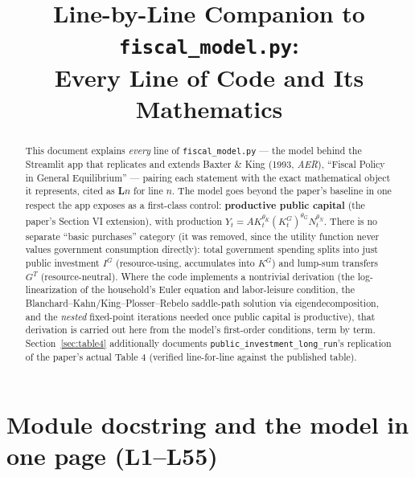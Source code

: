 \documentclass[11pt]{article}
\title{Line-by-Line Companion to \texttt{fiscal\_model.py}:\\
Every Line of Code and Its Mathematics}
\author{}
\date{}
\begin{document}
\maketitle

\begin{abstract}
\noindent This document explains \emph{every} line of \texttt{fiscal\_model.py}
--- the model behind the Streamlit app that replicates and extends Baxter \&
King (1993, \textit{AER}), ``Fiscal Policy in General Equilibrium'' ---
pairing each statement with the exact mathematical object it represents,
cited as \textbf{L}$n$ for line $n$. The model goes beyond the paper's
baseline in one respect the app exposes as a first-class control:
\textbf{productive public capital} (the paper's Section VI extension), with
production $Y_t=AK_t^{\theta_K}(K^G_t)^{\theta_G}N_t^{\theta_N}$. There is no
separate ``basic purchases'' category (it was removed, since the utility
function never values government consumption directly): total government
spending splits into just public investment $I^G$ (resource-using,
accumulates into $K^G$) and lump-sum transfers $G^T$ (resource-neutral).
Where the code implements a nontrivial derivation (the log-linearization of
the household's Euler equation and labor-leisure condition, the
Blanchard--Kahn/King--Plosser--Rebelo saddle-path solution via
eigendecomposition, and the \emph{nested} fixed-point iterations needed once
public capital is productive), that derivation is carried out here from the
model's first-order conditions, term by term. Section~\ref{sec:table4}
additionally documents \texttt{public\_investment\_long\_run}'s replication
of the paper's actual Table 4 (verified line-for-line against the published
table).
\end{abstract}

\tableofcontents

\section{Module docstring and the model in one page (L1--L55)}
\end{document}
